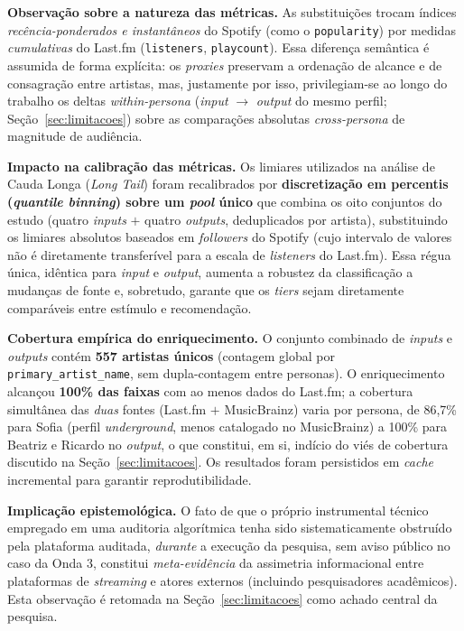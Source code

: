 \documentclass[12pt, %
openright,
oneside, %
a4paper,    %
english,   %
brazil]{facom-ufu-abntex2}
\begin{document}
\noindent\textbf{Observação sobre a natureza das métricas.} As substituições
trocam índices \emph{recência-ponderados e instantâneos} do Spotify (como o
\texttt{popularity}) por medidas \emph{cumulativas} do Last.fm
(\texttt{listeners}, \texttt{playcount}). Essa diferença semântica é assumida de
forma explícita: os \emph{proxies} preservam a ordenação de alcance e de
consagração entre artistas, mas, justamente por isso, privilegiam-se ao longo do
trabalho os deltas \emph{within-persona} (\emph{input} $\rightarrow$ \emph{output}
do mesmo perfil; Seção~\ref{sec:limitacoes}) sobre as comparações absolutas
\emph{cross-persona} de magnitude de audiência.

\textbf{Impacto na calibração das métricas.} Os limiares utilizados na análise de
Cauda Longa (\emph{Long Tail}) foram recalibrados por \textbf{discretização em
percentis (\emph{quantile binning}) sobre um
\emph{pool} único} que combina os oito conjuntos do estudo (quatro \emph{inputs}
$+$ quatro \emph{outputs}, deduplicados por artista), substituindo os limiares
absolutos baseados em \emph{followers} do Spotify (cujo intervalo de valores não
é diretamente transferível para a escala de \emph{listeners} do Last.fm). Essa
régua única, idêntica para \emph{input} e \emph{output}, aumenta a robustez
da classificação a mudanças de fonte e, sobretudo, garante que os \emph{tiers}
sejam diretamente comparáveis entre estímulo e recomendação.

\textbf{Cobertura empírica do enriquecimento.} O conjunto combinado de
\emph{inputs} e \emph{outputs} contém \textbf{557 artistas únicos} (contagem
global por \texttt{primary\_artist\_name}, sem dupla-contagem entre personas). O
enriquecimento alcançou \textbf{100\% das faixas} com ao menos dados do Last.fm;
a cobertura simultânea das \emph{duas} fontes (Last.fm $+$ MusicBrainz) varia por
persona, de 86,7\% para Sofia (perfil \emph{underground}, menos catalogado no
MusicBrainz) a 100\% para Beatriz e Ricardo no \emph{output}, o que constitui,
em si, indício do viés de cobertura discutido na Seção~\ref{sec:limitacoes}. Os
resultados foram persistidos em \emph{cache} incremental para garantir
reprodutibilidade.

\textbf{Implicação epistemológica.} O fato de que o próprio instrumental técnico
empregado em uma auditoria algorítmica tenha sido sistematicamente obstruído pela
plataforma auditada, \emph{durante} a execução da pesquisa, sem aviso público
no caso da Onda 3, constitui \emph{meta-evidência} da assimetria informacional
entre plataformas de \emph{streaming} e atores externos (incluindo pesquisadores
acadêmicos). Esta observação é retomada na Seção~\ref{sec:limitacoes} como achado
central da pesquisa.
\end{document}

